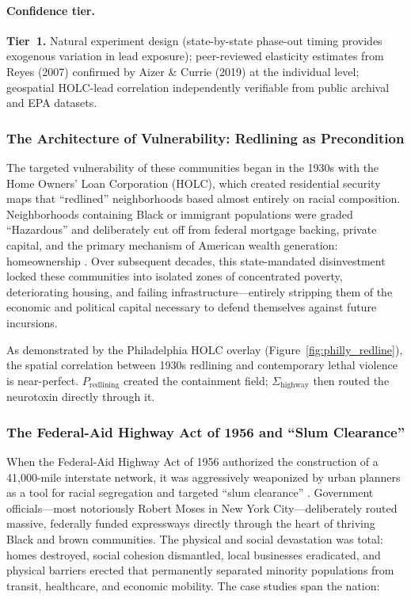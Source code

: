\paragraph{Confidence tier.}
\textbf{Tier~1.} Natural experiment design (state-by-state phase-out timing provides exogenous variation in lead exposure); peer-reviewed elasticity estimates from Reyes (2007) confirmed by Aizer \& Currie (2019) at the individual level; geospatial HOLC-lead correlation independently verifiable from public archival and EPA datasets.

\subsubsection{The Architecture of Vulnerability: Redlining as Precondition}

The targeted vulnerability of these communities began in the 1930s with the Home Owners' Loan Corporation (HOLC), which created residential security maps that ``redlined'' neighborhoods based almost entirely on racial composition. Neighborhoods containing Black or immigrant populations were graded ``Hazardous'' and deliberately cut off from federal mortgage backing, private capital, and the primary mechanism of American wealth generation: homeownership \cite{rothstein}. Over subsequent decades, this state-mandated disinvestment locked these communities into isolated zones of concentrated poverty, deteriorating housing, and failing infrastructure---entirely stripping them of the economic and political capital necessary to defend themselves against future incursions.

As demonstrated by the Philadelphia HOLC overlay (Figure~\ref{fig:philly_redline}), the spatial correlation between 1930s redlining and contemporary lethal violence is near-perfect. $P_{\text{redlining}}$ created the containment field; $\Sigma_{\text{highway}}$ then routed the neurotoxin directly through it.

\subsubsection{The Federal-Aid Highway Act of 1956 and ``Slum Clearance''}

When the Federal-Aid Highway Act of 1956 authorized the construction of a 41,000-mile interstate network, it was aggressively weaponized by urban planners as a tool for racial segregation and targeted ``slum clearance'' \cite{tel_highway_act}. Government officials---most notoriously Robert Moses in New York City---deliberately routed massive, federally funded expressways directly through the heart of thriving Black and brown communities. The physical and social devastation was total: homes destroyed, social cohesion dismantled, local businesses eradicated, and physical barriers erected that permanently separated minority populations from transit, healthcare, and economic mobility. The case studies span the nation:

